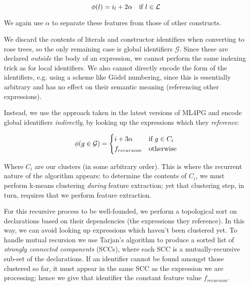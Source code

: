 \begin{equation} \label{eq:localfeature}
  \phi(l) = i_l + 2 \alpha \quad \text{if $l \in \mathcal{L}$}
\end{equation}

We again use $\alpha$ to separate these features from those of other constructs.

We discard the contents of literals and constructor identifiers when converting to rose trees, so the only remaining case is global identifiers $\mathcal{G}$. Since these are declared \emph{outside} the body of an expression, we cannot perform the same indexing trick as for local identifiers. We also cannot directly encode the form of the identifiers, e.g. using a scheme like G{\"o}del numbering, since this is essentially arbitrary and has no effect on their semantic meaning (referencing other expressions).

Instead, we use the approach taken in the latest versions of ML4PG and encode global identifiers \emph{indirectly}, by looking up the expressions which they \emph{reference}:

\begin{equation} \label{eq:globalfeature}
  \phi(g \in \mathcal{G}) =
    \begin{cases}
      i + 3 \alpha \quad & \text{if $g \in C_i$} \\
      f_{recursion}         & \text{otherwise}
    \end{cases}
\end{equation}

Where $C_i$ are our clusters (in some arbitrary order). This is where the recurrent nature of the algorithm appears: to determine the contents of $C_i$, we must perform k-means clustering \emph{during} feature extraction; yet that clustering step, in turn, requires that we perform feature extraction.

For this recursive process to be well-founded, we perform a topological sort on declarations based on their dependencies (the expressions they reference). In this way, we can avoid looking up expressions which haven't been clustered yet. To handle mutual recursion we use Tarjan's algorithm \cite{tarjan1972depth} to produce a sorted list of \emph{strongly connected components} (SCCs), where each SCC is a mutually-recursive sub-set of the declarations. If an identifier cannot be found amongst those clustered so far, it must appear in the same SCC as the expression we are processing; hence we give that identifier the constant feature value $f_{recursion}$.

